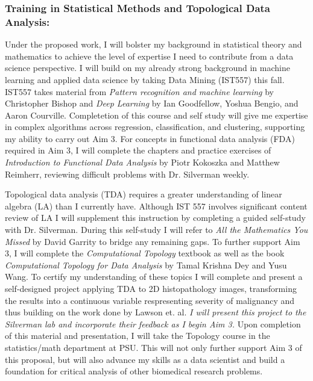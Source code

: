 \documentclass{NIHGrant}
\begin{document}
\subsubsection*{Training in Statistical Methods and Topological Data Analysis:}
Under the proposed work, I will bolster my background in statistical theory and mathematics to achieve the level of expertise I need to contribute from a data science perspective. I will build on my already strong background in machine learning and applied data science by taking Data Mining (IST557) this fall. IST557 takes material from \textit{Pattern recognition and machine learning} by Christopher Bishop and \textit{Deep Learning} by Ian Goodfellow, Yoshua Bengio, and Aaron Courville. Completetion of this course and self study will give me expertise in complex algorithms across regression, classification, and clustering, supporting my ability to carry out Aim 3. For concepts in functional data analysis (FDA) required in Aim 3, I will complete the chapters and practice exercises of \textit{Introduction to Functional Data Analysis} by Piotr Kokoszka and Matthew Reimherr, reviewing difficult problems with Dr. Silverman weekly.

Topological data analysis (TDA) requires a greater understanding of linear algebra (LA) than I currently have. Although IST 557 involves significant content review of LA I will supplement this instruction by completing a guided self-study with Dr. Silverman. During this self-study I will refer to \textit{All the Mathematics You Missed} by David Garrity to bridge any remaining gaps. To further support Aim 3, I will complete the \textit{Computational Topology} textbook as well as the book \textit{Computational Topology for Data Analysis} by Tamal Krishna Dey and Yusu Wang. To certify my understanding of these topics I will complete and present a self-designed project applying TDA to 2D histopathology images, transforming the results into a continuous variable respresenting severity of malignancy and thus building on the work done by Lawson et. al. \emph{I will present this project to the Silverman lab and incorporate their feedback as I begin Aim 3.} Upon completion of this material and presentation, I will take the Topology course in the statistics/math department at PSU. This will not only further support Aim 3 of this proposal, but will also advance my skills as a data scientist and build a foundation for critical analysis of other biomedical research problems.
\end{document}
